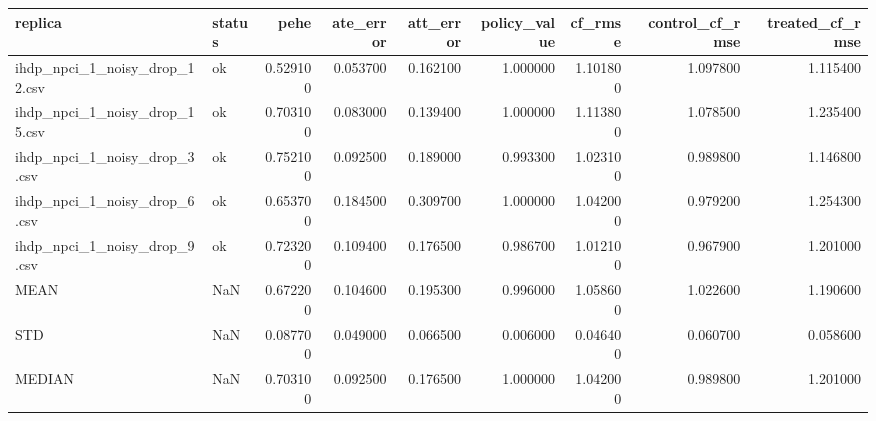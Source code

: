 \begin{tabular}{llrrrrrrr}
\toprule
replica & status & pehe & ate_error & att_error & policy_value & cf_rmse & control_cf_rmse & treated_cf_rmse \\
\midrule
ihdp_npci_1_noisy_drop_12.csv & ok & 0.529100 & 0.053700 & 0.162100 & 1.000000 & 1.101800 & 1.097800 & 1.115400 \\
ihdp_npci_1_noisy_drop_15.csv & ok & 0.703100 & 0.083000 & 0.139400 & 1.000000 & 1.113800 & 1.078500 & 1.235400 \\
ihdp_npci_1_noisy_drop_3.csv & ok & 0.752100 & 0.092500 & 0.189000 & 0.993300 & 1.023100 & 0.989800 & 1.146800 \\
ihdp_npci_1_noisy_drop_6.csv & ok & 0.653700 & 0.184500 & 0.309700 & 1.000000 & 1.042000 & 0.979200 & 1.254300 \\
ihdp_npci_1_noisy_drop_9.csv & ok & 0.723200 & 0.109400 & 0.176500 & 0.986700 & 1.012100 & 0.967900 & 1.201000 \\
MEAN & NaN & 0.672200 & 0.104600 & 0.195300 & 0.996000 & 1.058600 & 1.022600 & 1.190600 \\
STD & NaN & 0.087700 & 0.049000 & 0.066500 & 0.006000 & 0.046400 & 0.060700 & 0.058600 \\
MEDIAN & NaN & 0.703100 & 0.092500 & 0.176500 & 1.000000 & 1.042000 & 0.989800 & 1.201000 \\
\bottomrule
\end{tabular}
